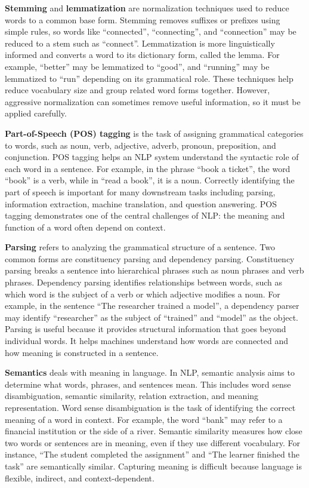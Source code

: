 \documentclass[11pt]{article}
\begin{document}
\textbf{Stemming} and \textbf{lemmatization} are normalization techniques used to reduce words to a common base form. Stemming removes suffixes or prefixes using simple rules, so words like ``connected'', ``connecting'', and ``connection'' may be reduced to a stem such as ``connect''. Lemmatization is more linguistically informed and converts a word to its dictionary form, called the lemma. For example, ``better'' may be lemmatized to ``good'', and ``running'' may be lemmatized to ``run'' depending on its grammatical role. These techniques help reduce vocabulary size and group related word forms together. However, aggressive normalization can sometimes remove useful information, so it must be applied carefully.

\textbf{Part-of-Speech (POS) tagging} is the task of assigning grammatical categories to words, such as noun, verb, adjective, adverb, pronoun, preposition, and conjunction. POS tagging helps an NLP system understand the syntactic role of each word in a sentence. For example, in the phrase ``book a ticket'', the word ``book'' is a verb, while in ``read a book'', it is a noun. Correctly identifying the part of speech is important for many downstream tasks including parsing, information extraction, machine translation, and question answering. POS tagging demonstrates one of the central challenges of NLP: the meaning and function of a word often depend on context.

\textbf{Parsing} refers to analyzing the grammatical structure of a sentence. Two common forms are constituency parsing and dependency parsing. Constituency parsing breaks a sentence into hierarchical phrases such as noun phrases and verb phrases. Dependency parsing identifies relationships between words, such as which word is the subject of a verb or which adjective modifies a noun. For example, in the sentence ``The researcher trained a model'', a dependency parser may identify ``researcher'' as the subject of ``trained'' and ``model'' as the object. Parsing is useful because it provides structural information that goes beyond individual words. It helps machines understand how words are connected and how meaning is constructed in a sentence.

\textbf{Semantics} deals with meaning in language. In NLP, semantic analysis aims to determine what words, phrases, and sentences mean. This includes word sense disambiguation, semantic similarity, relation extraction, and meaning representation. Word sense disambiguation is the task of identifying the correct meaning of a word in context. For example, the word ``bank'' may refer to a financial institution or the side of a river. Semantic similarity measures how close two words or sentences are in meaning, even if they use different vocabulary. For instance, ``The student completed the assignment'' and ``The learner finished the task'' are semantically similar. Capturing meaning is difficult because language is flexible, indirect, and context-dependent.
\end{document}

